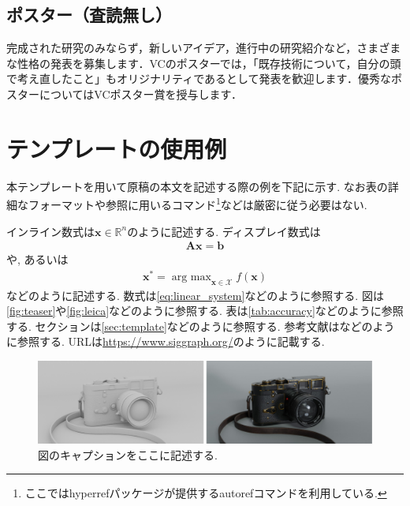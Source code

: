 \documentclass{vc}
\begin{document}
\subsection{ポスター（査読無し）}

完成された研究のみならず，新しいアイデア，進行中の研究紹介など，さまざまな性格の発表を募集します．VCのポスターでは，「既存技術について，自分の頭で考え直したこと」もオリジナリティであるとして発表を歓迎します．優秀なポスターについてはVCポスター賞を授与します．

\section{テンプレートの使用例}
\label{sec:template}

本テンプレートを用いて原稿の本文を記述する際の例を下記に示す.
なお表の詳細なフォーマットや参照に用いるコマンド\footnote{ここでは\textsf{hyperref}パッケージが提供する\textsf{autoref}コマンド\cite{Wikibooks:LaTeX:Ref}を利用している.}などは厳密に従う必要はない.

インライン数式は$\mathbf{x} \in \mathbb{R}^{n}$のように記述する.
ディスプレイ数式は
\begin{align}
  \mathbf{A} \mathbf{x} = \mathbf{b}
  \label{eq:linear_system}
\end{align}
や, あるいは
\begin{align}
  \mathbf{x}^{*} = \mathop{\text{arg max}}_{\mathbf{x} \in \mathcal{X}} f(\mathbf{x})
\end{align}
などのように記述する.
数式は\autoref{eq:linear_system}などのように参照する.
図は\autoref{fig:teaser}や\autoref{fig:leica}などのように参照する.
表は\autoref{tab:accuracy}などのように参照する.
セクションは\autoref{sec:template}などのように参照する.
参考文献は\cite{GSC12,WL00}などのように参照する.
URLは\url{https://www.siggraph.org/}のように記載する.

\begin{figure}
  \centering
  \includegraphics[width=\columnwidth]{./figures/leica.pdf}
  \caption{図のキャプションをここに記述する.}
  \label{fig:leica}
\end{figure}
\end{document}
